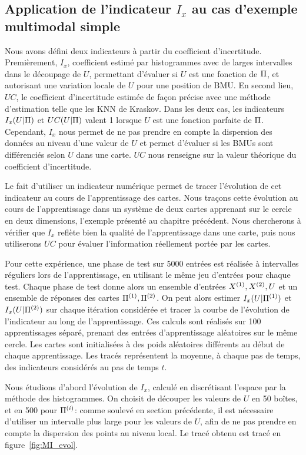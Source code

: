 \documentclass[../main]{subfiles}
\begin{document}
\subsection{Application de l'indicateur $I_x$ au cas d'exemple multimodal simple}

Nous avons défini deux indicateurs à partir du coefficient d'incertitude. Premièrement, $I_x$, coefficient estimé par histogrammes avec de larges intervalles dans le découpage de $U$, permettant d'évaluer si $U$ est une fonction de $\Pi$, et autorisant une variation locale de $U$ pour une position de BMU.
En second lieu, $UC$, le coefficient d'incertitude estimée de façon précise avec une méthode d'estimation telle que les KNN de Kraskov.
Dans les deux cas, les indicateurs $I_x(U|\Pi)$ et $UC(U|\Pi)$ valent 1 lorsque $U$ est une fonction parfaite de $\Pi$. Cependant, $I_x$ nous permet de ne pas prendre en compte la dispersion des données au niveau d'une valeur de $U$ et permet d'évaluer si les BMUs sont différenciés selon $U$ dans une carte. 
$UC$ nous renseigne sur la valeur théorique du coefficient d'incertitude.

Le fait d'utiliser un indicateur numérique permet de tracer l'évolution de cet indicateur au cours de l'apprentissage des cartes.
Nous traçons cette évolution au cours de l'apprentissage dans un système de deux cartes apprenant sur le cercle en deux dimensions, l'exemple présenté au chapitre précédent.
Nous chercherons à vérifier que $I_x$ reflète bien la qualité de l'apprentissage dans une carte, puis nous utiliserons $UC$ pour évaluer l'information réellement portée par les cartes.

Pour cette expérience, une phase de test sur 5000 entrées est réalisée à intervalles réguliers lors de l'apprentissage, en utilisant le même jeu d'entrées pour chaque test. Chaque phase de test donne alors un ensemble d'entrées $X^{({1})}, X^{({2})}, U$ et un ensemble de réponses des cartes $\Pi^{({1})}, \Pi^{({2})}$. On peut alors estimer $I_x(U|\Pi^{({1})})$ et $I_x(U|\Pi^{({2})})$ sur chaque itération considérée et tracer la courbe de l'évolution de l'indicateur au long de l'apprentissage. 
Ces calculs sont réalisés sur 100 apprentissages séparé, prenant des entrées d'apprentissage aléatoires sur le même cercle. Les cartes sont initialisées à des poids aléatoires différents au début de chaque apprentissage. 
Les tracés représentent la moyenne, à chaque pas de temps, des indicateurs considérés au pas de temps $t$.

Nous étudions d'abord l'évolution de $I_x$, calculé en discrétisant l'espace par la méthode des histogrammes.
On choisit de découper les valeurs de $U$ en 50 boîtes, et en 500 pour $\Pi^{({i})}$: comme soulevé en section précédente, il est nécessaire d'utiliser un intervalle plus large pour les valeurs de $U$, afin de ne pas prendre en compte la dispersion des points au niveau local. Le tracé obtenu est tracé en figure~\ref{fig:MI_evol}.
\end{document}
